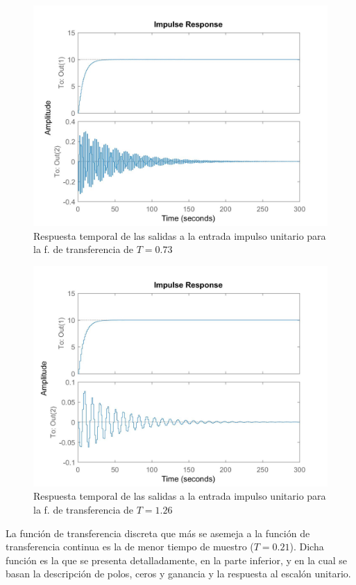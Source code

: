 \documentclass[journal]{IEEEtran}
\begin{document}
\begin{figure}[h!]
\caption{Respuesta temporal de las salidas a la entrada impulso unitario para la f. de transferencia de $T=0.73$\label{fig:impulseGd1}}
  \centering
\includegraphics[scale=0.18]{tf/impulse_Gd_1.jpg}
\end{figure}

\begin{figure}[h!]
\caption{Respuesta temporal de las salidas a la entrada impulso unitario para la f. de transferencia de $T=1.26$\label{fig:impulseGd2}}
  \centering
\includegraphics[scale=0.18]{tf/impulse_Gd_2.jpg}
\end{figure}

La función de transferencia discreta que más se asemeja a la función de transferencia continua es la de menor tiempo de muestro ($T=0.21$). Dicha función es la que se presenta detalladamente, en la parte inferior, y en la cual se basan la descripción de polos, ceros y ganancia y la respuesta al escalón unitario.\\
\end{document}
